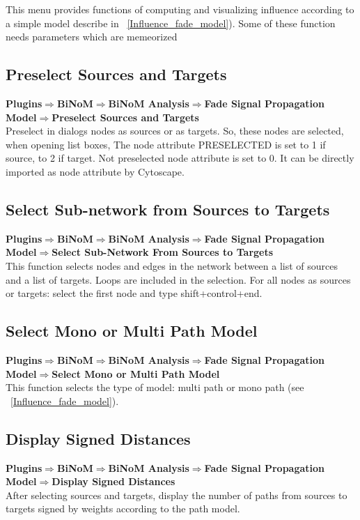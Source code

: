 This menu provides functions of computing and visualizing influence according to a simple model describe in ~\ref{Influence_fade_model}). Some of these function needs parameters which are memeorized

\subsection{Preselect Sources and Targets}
\textbf{Plugins$\Rightarrow$BiNoM$\Rightarrow$BiNoM Analysis$\Rightarrow$Fade Signal Propagation Model$\Rightarrow$Preselect Sources and Targets}\\
Preselect in dialogs nodes as sources or as targets. So, these nodes are selected, when opening list boxes, The node attribute PRESELECTED is set to 1 if source, to 2 if target. Not preselected node attribute is set to 0. It can be directly imported as node attribute by Cytoscape.

\subsection{Select Sub-network from Sources to Targets}
\textbf{Plugins$\Rightarrow$BiNoM$\Rightarrow$BiNoM Analysis$\Rightarrow$Fade Signal Propagation Model$\Rightarrow$Select Sub-Network From Sources to Targets}\\
This function selects nodes and edges in the network between a list of sources and a list of targets.  Loops are included in the selection. For all nodes as sources or targets: select the first node and type shift+control+end.

\subsection{Select Mono or Multi Path Model}
\textbf{Plugins$\Rightarrow$BiNoM$\Rightarrow$BiNoM Analysis$\Rightarrow$Fade Signal Propagation Model$\Rightarrow$Select Mono or Multi Path Model}\\
This function selects the type of model: multi path or mono path (see ~\ref{Influence_fade_model}).

\subsection{Display Signed Distances}
\textbf{Plugins$\Rightarrow$BiNoM$\Rightarrow$BiNoM Analysis$\Rightarrow$Fade Signal Propagation Model$\Rightarrow$Display Signed Distances}\\
After selecting sources and targets, display the number of paths from sources to targets signed by weights according to the path model.

